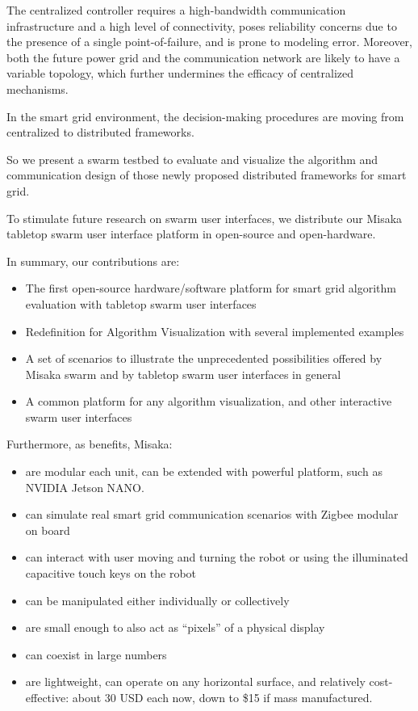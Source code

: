 \documentclass[conference]{IEEEtran}
\begin{document}
The centralized controller requires a high-bandwidth communication infrastructure and a high level of connectivity, poses reliability concerns due to the presence of a single point-of-failure, and is prone to modeling error. Moreover, both the future power grid and the communication network are likely to have a variable topology, which further undermines the efficacy of centralized mechanisms\cite{binetti2013distributed}.

In the smart grid environment, the decision-making procedures are moving from centralized to distributed frameworks\cite{yang2011communication}.

So we present a swarm testbed to evaluate and visualize the algorithm and communication design of those newly proposed distributed frameworks for smart grid.

To stimulate future research on swarm user interfaces, we distribute our Misaka tabletop swarm user interface platform in open-source and open-hardware.



In summary, our contributions are:

\begin{itemize}
    \item The first open-source hardware/software platform for smart grid algorithm evaluation with tabletop swarm user interfaces
    \item Redefinition for Algorithm Visualization with several implemented examples
    \item A set of scenarios to illustrate the unprecedented possibilities offered by Misaka swarm and by tabletop swarm user interfaces in general
    \item A common platform for any algorithm visualization, and other interactive swarm user interfaces
\end{itemize}

Furthermore, as benefits, Misaka:

\begin{itemize}
    \item are modular each unit, can be extended with powerful platform, such as NVIDIA Jetson NANO.
    \item can simulate real smart grid communication scenarios with Zigbee modular on board
    \item can interact with user moving and turning the robot or using the illuminated capacitive touch keys on the robot 
    \item can be manipulated either individually or collectively
    \item are small enough to also act as “pixels” of a physical display
    \item can coexist in large numbers
    \item are lightweight, can operate on any horizontal surface, and relatively cost-effective: about 30 USD each now, down to \$15 if mass manufactured.
\end{itemize}
\end{document}
